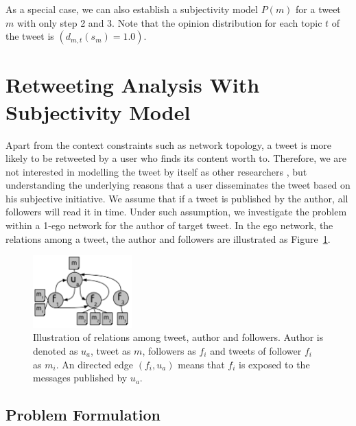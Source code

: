 \documentclass{acm_proc_article-sp}
\begin{document}
As a special case, we can also establish a subjectivity model $ P\left( m \right)  $ for a tweet $ m $ with only step 2 and 3. Note that the opinion distribution for each topic $ t $ of the tweet is $(d_{m,t}\left( s_{m}\right)= 1.0 )$. 

\section{Retweeting Analysis With Subjectivity Model}

Apart from the context constraints such as network topology, a tweet is more likely to be retweeted by a user who finds its content worth to. 
Therefore, we are not interested in modelling the tweet by itself as other researchers \cite{naveed2011searching,pfitzner2012emotional}, but understanding the underlying reasons that a user disseminates the tweet based on his subjective initiative. 
We assume that if a tweet is published by the author, all followers will read it in time. 
Under such assumption, we investigate the problem within a 1-ego network for the author of target tweet. 
In the ego network, the relations among a tweet, the author and followers are illustrated as Figure~\ref{fig1}.
\begin{figure}[htb]
\centering
\includegraphics[width=1.5in,height=1.1in]{ego.pdf}
\caption{Illustration of relations among tweet, author and followers. Author is denoted as $ u_{a} $, tweet as $ m $, followers as $ f_{i} $ and tweets of follower $ f_{i} $ as $ m_{i} $. An directed edge $ \left( f_{i},u_{a} \right)  $ means that $ f_{i} $ is exposed to the messages published by $ u_{a} $.}
\label{fig1}
\end{figure}

\subsection{Problem Formulation}
\label{formulation}
\end{document}
